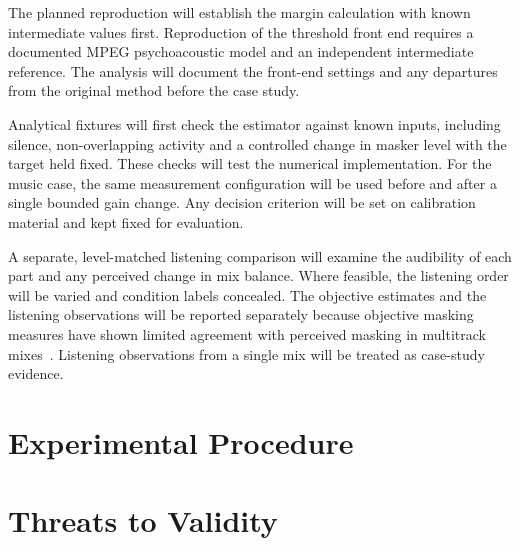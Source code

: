 The planned reproduction will establish the margin calculation with known intermediate values first. Reproduction of the threshold front end requires a documented MPEG psychoacoustic model and an independent intermediate reference. The analysis will document the front-end settings and any departures from the original method before the case study.

Analytical fixtures will first check the estimator against known inputs, including silence, non-overlapping activity and a controlled change in masker level with the target held fixed. These checks will test the numerical implementation. For the music case, the same measurement configuration will be used before and after a single bounded gain change. Any decision criterion will be set on calibration material and kept fixed for evaluation.

A separate, level-matched listening comparison will examine the audibility of each part and any perceived change in mix balance. Where feasible, the listening order will be varied and condition labels concealed. The objective estimates and the listening observations will be reported separately because objective masking measures have shown limited agreement with perceived masking in multitrack mixes~\cite{Hafezi2015}. Listening observations from a single mix will be treated as case-study evidence.

\section{Experimental Procedure}
\label{sec:eval-procedure}

\section{Threats to Validity}
\label{sec:eval-threats}
